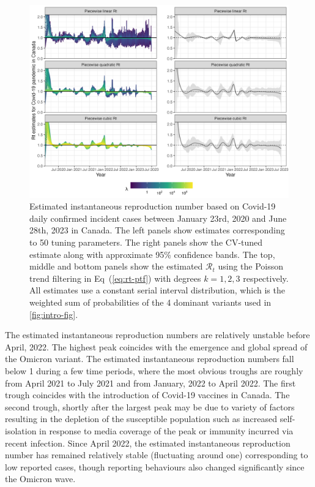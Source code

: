 \documentclass[10pt,letterpaper]{article}
\def\calR{\mathcal{R}}
\renewcommand{\eqref}[1]{Eq~(\ref{#1})}
\begin{document}
\begin{figure}[!t]
  \centering
  \includegraphics[width=0.9\linewidth]{fig/covid_full_res.png}
  \caption{Estimated instantaneous reproduction number based on Covid-19 daily
  confirmed incident cases between January 23rd, 2020 and June 28th, 2023 in
  Canada. The left panels show estimates corresponding to 50 tuning parameters.
  The right panels show the CV-tuned estimate along with approximate 95\%
  confidence bands. The top, middle and bottom panels show the estimated
  $\calR_t$ using the Poisson trend filtering in \eqref{eq:rt-ptf} with degrees
  $k=1,2,3$ respectively. All estimates use a constant serial interval
  distribution, which is the weighted sum of probabilities of the 4 dominant
  variants used in \autoref{fig:intro-fig}.} 
  \label{fig:covid-rt}
\end{figure} 

The estimated instantaneous reproduction numbers are relatively unstable before
April, 2022. The highest peak coincides with the emergence and global spread of
the Omicron variant. The estimated instantaneous reproduction numbers fall below
1 during a few time periods, where the most obvious troughs are roughly from
April 2021 to July 2021 and from January, 2022 to April 2022. The first trough
coincides with the introduction of Covid-19 vaccines in Canada. The second
trough, shortly after the largest peak may be due to variety of factors
resulting in the depletion of the susceptible population such as increased
self-isolation in response to media coverage of the peak or immunity incurred
via recent infection. Since April 2022, the estimated instantaneous reproduction
number has remained relatively stable (fluctuating around one) corresponding to
low reported cases, though reporting behaviours also changed significantly since
the Omicron wave. 
\end{document}
